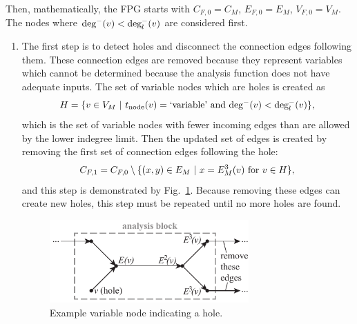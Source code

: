 	Then, mathematically, the FPG starts with $C_{F,0} = C_M$, $E_{F,0} = E_M$, $V_{F,0} = V_M$.
	The nodes where $\textrm{deg}^-(v) < \textrm{deg}_l^-(v)$ are considered first.
	\begin{enumerate}
	\item The first step is to detect holes and disconnect the connection edges following them. These connection edges are removed because they represent variables which cannot be determined because the analysis function does not have adequate inputs. The set of variable nodes which are holes is created as
	\begin{equation}
	H = \{v \in V_M \ | \  t_\textrm{node}(v) = \textrm{`variable'} \textrm{ and } \textrm{deg}^-(v) < \textrm{deg}_l^-(v) \},
	\end{equation}
	which is the set of variable nodes with fewer incoming edges than are allowed by the lower indegree limit.
	Then the updated set of edges is created by removing the first set of connection edges following the hole:
	\begin{equation}
	C_{F,1} = C_{F,0} \setminus \{(x,y) \in E_M \ | \  x=E_M^3(v) \textrm{ for } v \in H\},
	\end{equation}
	and this step is demonstrated by Fig.~\ref{f:hole}. Because removing these edges can create new holes, this step must be repeated until no more holes are found.
	\begin{figure}[htb!]
		\begin{center}
		\includegraphics[width=3in]{images/analysis_block_hole}
		\end{center}
		\vspace{-20pt}
	\caption{Example variable node indicating a hole.}
	\label{f:hole}
	\end{figure}


\end{enumerate}
